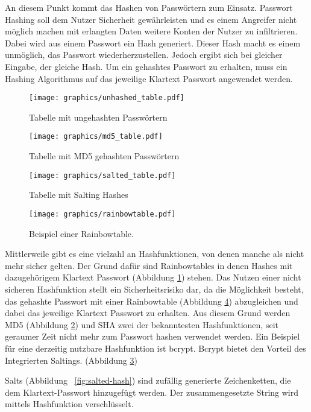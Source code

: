 An diesem Punkt kommt das Hashen von Passwörtern zum Einsatz. Passwort Hashing soll dem Nutzer Sicherheit gewährleisten und es einem Angreifer nicht möglich machen mit erlangten Daten weitere Konten der Nutzer zu infiltrieren. Dabei wird aus einem Passwort ein Hash generiert. Dieser Hash macht es einem unmöglich, das Passwort wiederherzustellen. Jedoch ergibt sich bei gleicher Eingabe, der gleiche Hash. Um ein gehashtes Passwort zu erhalten, muss ein Hashing Algorithmus auf das jeweilige Klartext Passwort angewendet werden.

\begin{figure}
	\texttt{[image: graphics/unhashed\_table.pdf]}
	\caption{Tabelle mit ungehashten Passwörtern}
	\label{fig:unhashed_table}
\end{figure}

\begin{figure}
	\texttt{[image: graphics/md5\_table.pdf]}
	\caption{Tabelle mit MD5 gehashten Passwörtern}
	\label{fig:md5_hashed_table}
\end{figure}

\begin{figure}
	\texttt{[image: graphics/salted\_table.pdf]}
	\caption{Tabelle mit Salting Hashes}
	\label{fig:salted_table}
\end{figure}

\begin{figure}
	\texttt{[image: graphics/rainbowtable.pdf]}
	\caption{Beispiel einer Rainbowtable.}
	\label{fig:rainbowtable}
\end{figure}

Mittlerweile gibt es eine vielzahl an Hashfunktionen, von denen manche als nicht mehr sicher gelten. Der Grund dafür sind Rainbowtables in denen Hashes mit dazugehörigem Klartext Passwort (Abbildung \ref{fig:unhashed_table}) stehen. Das Nutzen einer nicht sicheren Hashfunktion stellt ein Sicherheitsrisiko dar, da die Möglichkeit besteht, das gehashte Passwort mit einer Rainbowtable (Abbildung \ref{fig:rainbowtable}) abzugleichen und dabei das jeweilige Klartext Passwort zu erhalten. Aus diesem Grund werden MD5 (Abbildung \ref{fig:md5_hashed_table}) und SHA zwei der bekanntesten Hashfunktionen, seit geraumer Zeit nicht mehr zum Passwort hashen verwendet werden. Ein Beispiel für eine derzeitig nutzbare Hashfunktion ist bcrypt. Bcrypt bietet den Vorteil des Integrierten Saltings. (Abbildung \ref{fig:salted_table})

Salts (Abbildung ~\ref{fig:salted-hash}) sind zufällig generierte Zeichenketten, die dem Klartext-Passwort hinzugefügt werden. Der zusammengesetzte String wird mittels Hashfunktion verschlüsselt.

